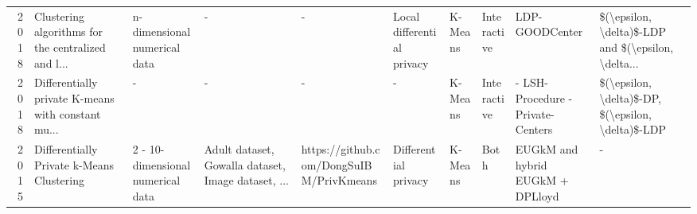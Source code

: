 \begin{landscape}
\begin{table}[ht]
\begin{adjustbox}{width=1.8\textwidth}
\begin{tabular}{rlllllllll}
        2018 \citep{nissim_clustering_2018}             & Clustering algorithms for the centralized and l...                                                            & n-dimensional numerical data         & -                                                  & -                                       & Local differential privacy & K-Means             & Interactive     & LDP-GOODCenter                            & \$(\textbackslash epsilon, \textbackslash delta)\$-LDP and \$(\textbackslash epsilon, \textbackslash delta... \\
        2018 \citep{nissim_clustering_2018}             & Differentially private K-means with constant mu...                                                            & -                                    & -                                                  & -                                       & -                          & K-Means             & Interactive     & - LSH-Procedure
        - Private-Centers                               & \$(\textbackslash epsilon, \textbackslash delta)\$-DP, \$(\textbackslash epsilon, \textbackslash delta)\$-LDP                                                                                                                                                                                                                                                                                                                                                                        \\
        2015 \citep{su_differentially_2015-1}           & Differentially Private k-Means Clustering                                                                     & 2 - 10-dimensional numerical data    & Adult dataset, Gowalla dataset, Image dataset, ... & https://github.com/DongSuIBM/PrivKmeans & Differential privacy       & K-Means             & Both            & EUGkM and hybrid EUGkM + DPLloyd          & -                                                                                                             \\

\end{tabular}
\end{adjustbox}
\end{table}
\end{landscape}
